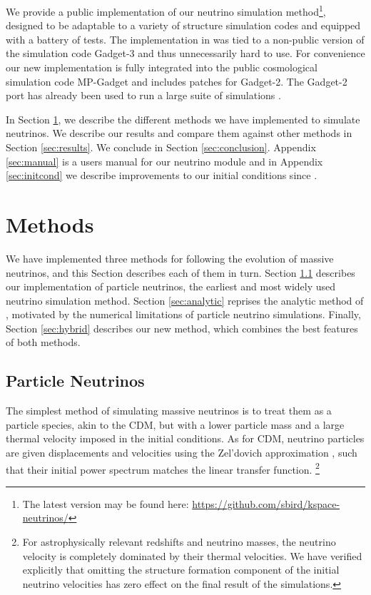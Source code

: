 \documentclass[useAMS, usenatbib]{mnras}
\begin{document}
We provide a public implementation of our neutrino simulation method\footnote{The latest version may be found here: \url{https://github.com/sbird/kspace-neutrinos/}},
designed to be adaptable to a variety of structure simulation codes and equipped with a battery of tests.
The implementation in \cite{AHB} was tied to a non-public version of the simulation code Gadget-3 \cite{Springel_2005} and thus unnecessarily hard to use.
For convenience our new implementation is fully integrated into the public cosmological simulation code MP-Gadget \cite{Feng_2016} and includes patches for Gadget-2.
The Gadget-2 port has already been used to run a large suite of simulations \citep{Liu_2017}.

In Section \ref{sec:methods}, we describe the different methods we have implemented to simulate neutrinos. We describe our
results and compare them against other methods in Section \ref{sec:results}. We conclude in Section \ref{sec:conclusion}. Appendix \ref{sec:manual} is a users manual for our neutrino module and in Appendix \ref{sec:initcond} we describe improvements to our initial conditions since \cite{AHB}.

\section{Methods}
\label{sec:methods}

We have implemented three methods for following the evolution of massive neutrinos, and this Section describes each of them in turn. Section \ref{sec:particle} describes our implementation of particle neutrinos, the earliest and most widely used neutrino simulation method. Section \ref{sec:analytic} reprises the analytic method of \cite{AHB}, motivated by the numerical limitations of particle neutrino simulations. Finally, Section \ref{sec:hybrid} describes our new method, which combines the best features of both methods.

\subsection{Particle Neutrinos}
\label{sec:particle}

The simplest method of simulating massive neutrinos is to treat them as a particle species, akin
to the CDM, but with a lower particle mass and a large thermal velocity imposed
in the initial conditions. As for CDM, neutrino particles are given displacements and velocities using the Zel'dovich approximation \citep{Zeldovich_1970}, such that their initial power spectrum matches the linear transfer function. \footnote{For astrophysically relevant redshifts and neutrino masses, the neutrino velocity is completely dominated by their thermal velocities. We have verified explicitly that omitting the structure formation component of the initial neutrino velocities has zero effect on the final result of the simulations.}
\end{document}

